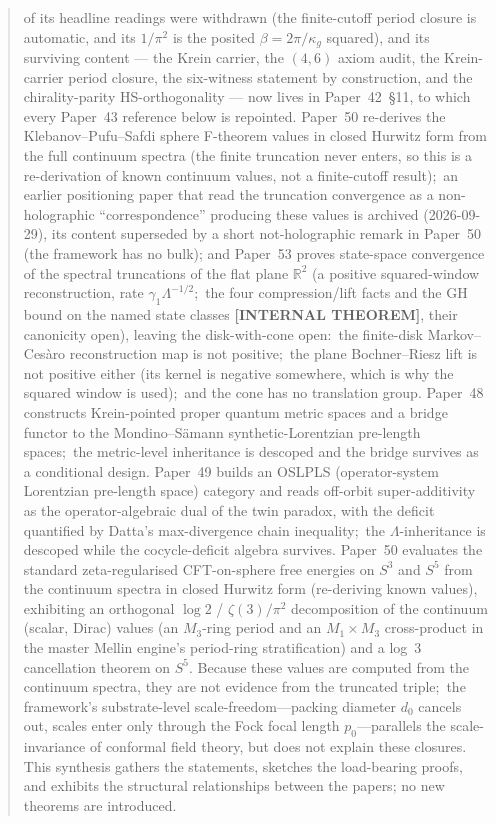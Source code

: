 \documentclass[11pt,a4paper]{article}
\theoremstyle{plain}
\theoremstyle{definition}
\newcommand{\sthree}{S^{3}}
\newcommand{\sfive}{S^{5}}
\begin{document}
\begin{abstract}
of its headline readings were withdrawn (the finite-cutoff period closure is
automatic, and its $1/\pi^{2}$ is the posited $\beta = 2\pi/\kappa_g$
squared), and its surviving content --- the Krein carrier, the $(4,6)$
axiom audit, the Krein-carrier period closure, the six-witness statement
by construction, and the chirality-parity HS-orthogonality --- now lives in
Paper~42~\S 11, to which every Paper~43 reference below is repointed. Paper~50
re-derives the Klebanov--Pufu--Safdi sphere F-theorem values in closed
Hurwitz form from the full continuum spectra (the finite truncation never
enters, so this is a re-derivation of known continuum values, not a
finite-cutoff result);\ an earlier positioning paper that read the
truncation convergence as a non-holographic ``correspondence'' producing
these values is archived (2026-09-29), its content superseded by a short
not-holographic remark in Paper~50 (the framework has no bulk); and Paper~53
proves state-space convergence of the spectral truncations of the flat plane
$\mathbb{R}^{2}$ (a positive squared-window reconstruction, rate
$\gamma_{1}\Lambda^{-1/2}$;\ the four compression/lift facts
and the GH bound on the named state classes \textbf{[INTERNAL THEOREM]}, their
canonicity open), leaving the
disk-with-cone open:\ the finite-disk Markov--Ces\`aro reconstruction map is
not positive;\ the plane Bochner--Riesz lift is not positive either (its
kernel is negative somewhere, which is why the squared window is used);\ and
the cone has no translation group.
Paper~48 constructs Krein-pointed proper quantum metric spaces and a
bridge functor to the Mondino--S\"amann synthetic-Lorentzian
pre-length spaces;\ the metric-level inheritance is descoped and the
bridge survives as a conditional design.
Paper~49 builds an OSLPLS (operator-system Lorentzian pre-length
space) category and reads off-orbit super-additivity as the
operator-algebraic dual of the twin paradox, with the deficit
quantified by Datta's max-divergence chain inequality;\ the
$\Lambda$-inheritance is descoped while the cocycle-deficit algebra
survives.
Paper~50 evaluates the standard zeta-regularised CFT-on-sphere
free energies on $\sthree$ and $\sfive$ from the continuum spectra in
closed Hurwitz form (re-deriving known values), exhibiting an
orthogonal $\log 2$ / $\zeta(3)/\pi^{2}$ decomposition of the continuum
(scalar, Dirac) values (an $M_{3}$-ring period and an $M_{1}\times M_{3}$
cross-product in the master Mellin engine's period-ring stratification)
and a log~3 cancellation theorem on $\sfive$.
Because these values are computed from the continuum spectra, they are
not evidence from the truncated triple;\ the framework's substrate-level
scale-freedom---packing diameter $d_{0}$ cancels out, scales enter
only through the Fock focal length $p_{0}$---parallels the
scale-invariance of conformal field theory, but does not explain these
closures.  This
synthesis gathers the statements, sketches the load-bearing proofs,
and exhibits the structural relationships between the papers; no
new theorems are introduced.
\end{abstract}
\end{document}
